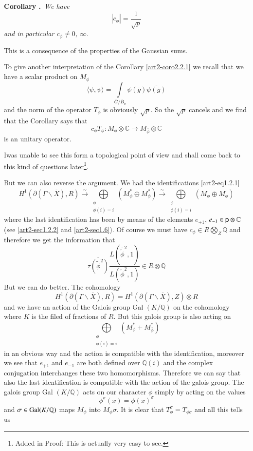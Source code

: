 \medskip
\noindent
{\bf Corollary .\label{art2-coro2.2.1}}~{\em We have}
$$
|c_{\phi}|=\frac{1}{\sqrt{p}}
$$
{\em and in particular $c_{\phi}\neq 0$, $\infty$.}

\vfill\eject

This is a consequence of the properties of the Gaussian sums.

To give another interpretation of the Corollary \ref{art2-coro2.2.1} we recall that we have a scalar product on $M_{\phi}$
$$
\langle \psi,\psi\rangle = \int\limits_{\overline{G}/\overline{B}_{o}}\psi(\overline{g})\overline{\psi(\overline{g})}
$$
and the norm of the operator $T_{\phi}$ is obviously $\sqrt{p}$. So the $\sqrt{p}$ cancels and we find that the Corollary says that
$$
c_{\phi}T_{\phi}:M_{\phi}\otimes \mathbb{C}\to M_{\overline{\phi}}\otimes \mathbb{C}
$$
is an unitary operator.

I\pageoriginale was unable to see this form a topological point of view and shall come back to this kind of questions later\footnote[1]{Added in Proof: This is actually very easy to see.}.

But we can also reverse the argument. We had the identifications \eqref{art2-eq1.2.1}
$$
H^{1}(\partial(\Gamma\backslash \overline{X}),R)\xrightarrow{\sim}\bigoplus\limits_{\substack{\phi\\ \phi(i)=i}}(M^{*}_{\phi}\oplus M^{*}_{\phi})\xrightarrow{\sim}\bigoplus\limits_{\substack{\phi\\ \phi(i)=i}}(M_{\phi}\oplus M_{\phi})
$$
where the last identification has been by means of the elements $e_{+1}$, $e_{-1}\in \mathsf{p} \otimes \mathbb{C}$ (see \ref{art2-sec1.2.2} and \ref{art2-sec1.6}). Of course we must have $c_{\phi}\in R\bigotimes\limits_{Z}\mathbb{Q}$ and therefore we get the information that
$$
\overline{\tau(\widetilde{\phi}^{2})}\frac{L(\overline{\widetilde{\phi}}^{2},1)}{L(\widetilde{\phi}^{2},1)}\in R\otimes \mathbb{Q}
$$
But we can do better. The cohomology
$$
H^{1}(\partial (\Gamma\backslash\overline{X}),R)=H^{1}(\partial(\Gamma\backslash\overline{X}),Z)\otimes R
$$
and we have an action of the Galois group Gal $(K/\mathbb{Q})$ on the cohomology where $K$ is the filed of fractions of $R$. But this galois group is also acting on 
$$
\bigoplus\limits_{\substack{\phi\\ \phi(i)=i}}(M^{*}_{\phi}+M^{*}_{\overline{\phi}})
$$
in an obvious way and the action is compatible with the identification, moreover we see that $e_{+1}$ and $e_{-1}$ are both defined over $\mathbb{Q}(i)$ and the complex conjugation interchanges these two homomorphisms. Therefore we can say that also the last identification is compatible with the action of the galois group. The galois group Gal $(K/\mathbb{Q})$ acts on our character $\phi$ simply by acting on the values
$$
\phi^{\sigma}(x)=\phi(x)^{\sigma}
$$
and $\sigma\in \operatorname{Gal}(K/\mathbb{Q})$ maps $M_{\phi}$ into $M_{\phi}\sigma$. It is clear that $T^{\sigma}_{\phi}=T_{\phi\sigma}$ and all this tells us

